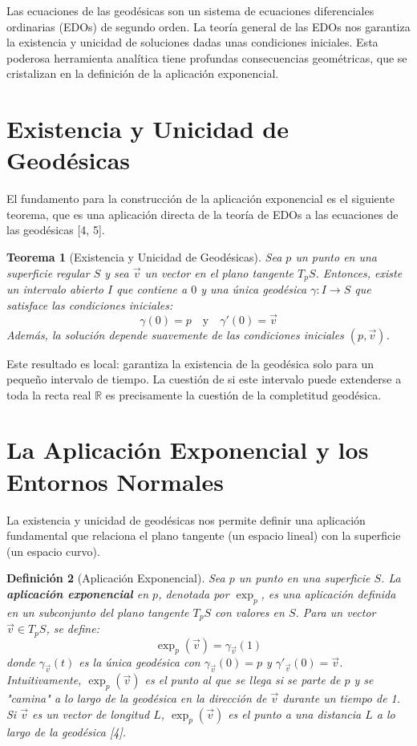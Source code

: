 \documentclass[12pt, a4paper]{report}
\theoremstyle{miestilo}
\newtheorem{teorema}{Teorema}[chapter]
\theoremstyle{midefinicion}
\newtheorem{definicion}[teorema]{Definición}
\begin{document}
Las ecuaciones de las geodésicas son un sistema de ecuaciones diferenciales ordinarias (EDOs) de segundo orden. La teoría general de las EDOs nos garantiza la existencia y unicidad de soluciones dadas unas condiciones iniciales. Esta poderosa herramienta analítica tiene profundas consecuencias geométricas, que se cristalizan en la definición de la aplicación exponencial.

\section{Existencia y Unicidad de Geodésicas}

El fundamento para la construcción de la aplicación exponencial es el siguiente teorema, que es una aplicación directa de la teoría de EDOs a las ecuaciones de las geodésicas [4, 5].

\begin{teorema}[Existencia y Unicidad de Geodésicas]
Sea $p$ un punto en una superficie regular $S$ y sea $\vec{v}$ un vector en el plano tangente $T_pS$. Entonces, existe un intervalo abierto $I$ que contiene a $0$ y una única geodésica $\gamma: I \to S$ que satisface las condiciones iniciales:
$$\gamma(0) = p \quad \text{y} \quad \gamma'(0) = \vec{v}$$
Además, la solución depende suavemente de las condiciones iniciales $(p, \vec{v})$.
\end{teorema}

Este resultado es local: garantiza la existencia de la geodésica solo para un pequeño intervalo de tiempo. La cuestión de si este intervalo puede extenderse a toda la recta real $\mathbb{R}$ es precisamente la cuestión de la completitud geodésica.

\section{La Aplicación Exponencial y los Entornos Normales}

La existencia y unicidad de geodésicas nos permite definir una aplicación fundamental que relaciona el plano tangente (un espacio lineal) con la superficie (un espacio curvo).

\begin{definicion}[Aplicación Exponencial]
Sea $p$ un punto en una superficie $S$. La \textbf{aplicación exponencial} en $p$, denotada por $\exp_p$, es una aplicación definida en un subconjunto del plano tangente $T_pS$ con valores en $S$. Para un vector $\vec{v} \in T_pS$, se define:
$$\exp_p(\vec{v}) = \gamma_{\vec{v}}(1)$$
donde $\gamma_{\vec{v}}(t)$ es la única geodésica con $\gamma_{\vec{v}}(0) = p$ y $\gamma'_{\vec{v}}(0) = \vec{v}$.
Intuitivamente, $\exp_p(\vec{v})$ es el punto al que se llega si se parte de $p$ y se "camina" a lo largo de la geodésica en la dirección de $\vec{v}$ durante un tiempo de 1. Si $\vec{v}$ es un vector de longitud $L$, $\exp_p(\vec{v})$ es el punto a una distancia $L$ a lo largo de la geodésica [4].
\end{definicion}
\end{document}

